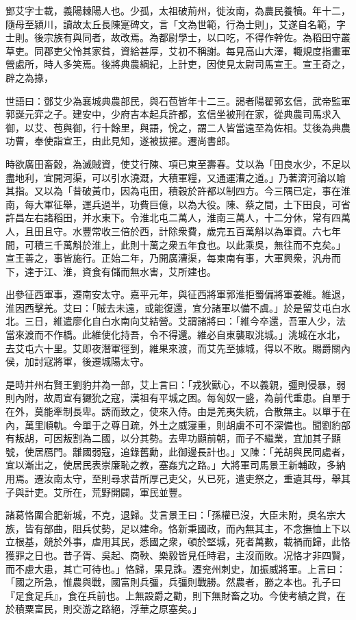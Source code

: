 
\begin{pinyinscope}
鄧艾字士載，義陽棘陽人也。少孤，太祖破荊州，徙汝南，為農民養犢。年十二，隨母至潁川，讀故太丘長陳寔碑文，言「文為世範，行為士則」，艾遂自名範，字士則。後宗族有與同者，故改焉。為都尉學士，以口吃，不得作幹佐。為稻田守叢草吏。同郡吏父怜其家貧，資給甚厚，艾初不稱謝。每見高山大澤，輙規度指畫軍營處所，時人多笑焉。後將典農綱紀，上計吏，因使見太尉司馬宣王。宣王奇之，辟之為掾，

世語曰：鄧艾少為襄城典農部民，與石苞皆年十二三。謁者陽翟郭玄信，武帝監軍郭誕元弈之子。建安中，少府吉本起兵許都，玄信坐被刑在家，從典農司馬求入御，以艾、苞與御，行十餘里，與語，恱之，謂二人皆當遠至為佐相。艾後為典農功曹，奉使詣宣王，由此見知，遂被拔擢。遷尚書郎。

時欲廣田畜糓，為滅賊資，使艾行陳、項已東至壽春。艾以為「田良水少，不足以盡地利，宜開河渠，可以引水澆溉，大積軍糧，又通運漕之道。」乃著濟河論以喻其指。又以為「昔破黃巾，因為屯田，積穀於許都以制四方。今三隅已定，事在淮南，每大軍征舉，運兵過半，功費巨億，以為大役。陳、蔡之間，土下田良，可省許昌左右諸稻田，并水東下。令淮北屯二萬人，淮南三萬人，十二分休，常有四萬人，且田且守。水豐常收三倍於西，計除衆費，歲完五百萬斛以為軍資。六七年間，可積三千萬斛於淮上，此則十萬之衆五年食也。以此乘吳，無往而不克矣。」宣王善之，事皆施行。正始二年，乃開廣漕渠，每東南有事，大軍興衆，汎舟而下，達于江、淮，資食有儲而無水害，艾所建也。

出參征西軍事，遷南安太守。嘉平元年，與征西將軍郭淮拒蜀偏將軍姜維。維退，淮因西擊羌。艾曰：「賊去未遠，或能復還，宜分諸軍以備不虞。」於是留艾屯白水北。三日，維遣廖化自白水南向艾結營。艾謂諸將曰：「維今卒還，吾軍人少，法當來渡而不作橋。此維使化持吾，令不得還。維必自東襲取洮城。」洮城在水北，去艾屯六十里。艾即夜潛軍徑到，維果來渡，而艾先至據城，得以不敗。賜爵關內侯，加討寇將軍，後遷城陽太守。

是時并州右賢王劉豹并為一部，艾上言曰：「戎狄獸心，不以義親，彊則侵暴，弱則內附，故周宣有玁狁之寇，漢祖有平城之困。每匈奴一盛，為前代重患。自單于在外，莫能牽制長卑。誘而致之，使來入侍。由是羌夷失統，合散無主。以單于在內，萬里順軌。今單于之尊日疏，外土之威寖重，則胡虜不可不深備也。聞劉豹部有叛胡，可因叛割為二國，以分其勢。去卑功顯前朝，而子不繼業，宜加其子顯號，使居鴈門。離國弱寇，追錄舊勳，此御邊長計也。」又陳：「羌胡與民同處者，宜以漸出之，使居民表崇廉恥之教，塞姦宄之路。」大將軍司馬景王新輔政，多納用焉。遷汝南太守，至則尋求昔所厚己吏父，乆已死，遣吏祭之，重遺其母，舉其子與計吏。艾所在，荒野開闢，軍民並豐。

諸葛恪圍合肥新城，不克，退歸。艾言景王曰：「孫權已沒，大臣未附，吳名宗大族，皆有部曲，阻兵仗勢，足以建命。恪新秉國政，而內無其主，不念撫恤上下以立根基，競於外事，虐用其民，悉國之衆，頓於堅城，死者萬數，載禍而歸，此恪獲罪之日也。昔子胥、吳起、商鞅、樂毅皆見任時君，主沒而敗。况恪才非四賢，而不慮大患，其亡可待也。」恪歸，果見誅。遷兖州刺史，加振威將軍。上言曰：「國之所急，惟農與戰，國富則兵彊，兵彊則戰勝。然農者，勝之本也。孔子曰『足食足兵』，食在兵前也。上無設爵之勸，則下無財畜之功。今使考績之賞，在於積粟富民，則交游之路絕，浮華之原塞矣。」


\end{pinyinscope}
